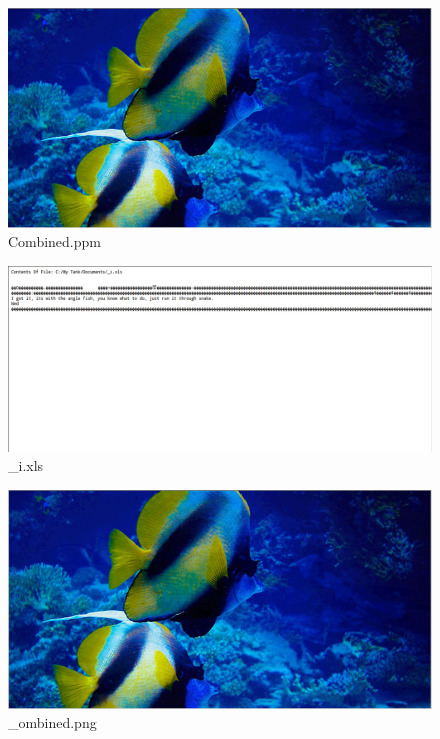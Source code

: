 \documentclass[12pt]{article}
\begin{document}
				\begin{figure}[ht!]
					\centering
					\includegraphics[width=12cm]{Images/CombinedPpm.png}
					\caption{Combined.ppm}
				\end{figure}
				
				\begin{figure}[ht!]
					\centering
					\includegraphics[width=12cm]{Images/_i.png}
					\caption{\_i.xls}
				\end{figure}

				\begin{figure}[ht!]
					\centering
					\includegraphics[width=12cm]{Images/_ombinedPng.png}
					\caption{\_ombined.png}
				\end{figure}
\end{document}
